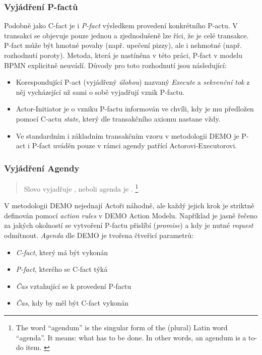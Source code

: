 \subsubsection{Vyjádření P-factů}
Podobně jako C-fact je i \textit{P-fact} výsledkem provedení konkrétního P-actu. V transakci se objevuje pouze jednou a zjednodušeně lze říci, že je  celé transakce. P-fact může být hmotné povahy (např. upečení pizzy), ale i nehmotné (např. rozhodnutí poroty). Metoda, která je nastíněna v této práci, P-fact v modelu BPMN explicitně neuvádí. Důvody pro toto rozhodnutí jsou následující:

\begin{itemize}
\item Korespondující P-act (vyjádřený \textit{úlohou}) nazvaný \textit{Execute} a \textit{sekvenční tok} z něj vycházející už sami o sobě vyjadřují vznik P-factu.
\item Actor-Initiator je o vzniku P-factu informován ve chvíli, kdy je mu předložen pomocí C-actu \textit{state}, který dle transakčního axiomu nastane vždy.
\item Ve standardním i základním transakčním vzoru v metodologii DEMO je P-act i P-fact uváděn pouze v rámci agendy patřící Actorovi-Executorovi.
\end{itemize}

\subsubsection{Vyjádření Agendy}

\begin{quote}
Slovo  vyjadřuje , neboli agenda je . \cite{Dietz2006}
\footnote{The word “agendum” is the singular form of the (plural) Latin word “agenda”. It means: what has to be done. In other words, an agendum is a to-do item. \cite{Dietz2006}}
\end{quote}

V metodologii DEMO nejednají Actoři náhodně, ale každý jejich krok je striktně definován pomocí \textit{action rules} v DEMO Action Modelu. Například je jasně řečeno  za jakých okolností se vytvoření P-factu přislíbí (\textit{promise}) a kdy je nutné \textit{request} odmítnout. \textit{Agenda} dle DEMO je tvořena čtveřicí parametrů:

\begin{itemize}
\item \textit{C-fact}, který má být vykonán
\item \textit{P-fact}, kterého se C-fact týká
\item \textit{Čas} vztahující se k provedení P-factu
\item \textit{Čas}, kdy by měl být C-fact vykonán 
\end{itemize}

